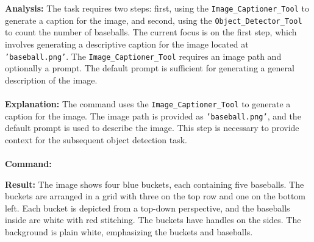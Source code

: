     
    \begin{executorbox}
    
    \textbf{Analysis:}
    The task requires two steps: first, using the \texttt{Image\_Captioner\_Tool} to generate a caption for the image, and second, using the \texttt{Object\_Detector\_Tool} to count the number of baseballs. The current focus is on the first step, which involves generating a descriptive caption for the image located at \texttt{'baseball.png'}. The \texttt{Image\_Captioner\_Tool} requires an image path and optionally a prompt. The default prompt is sufficient for generating a general description of the image.
    \\\\
    \textbf{Explanation:}
    The command uses the \texttt{Image\_Captioner\_Tool} to generate a caption for the image. The image path is provided as \texttt{'baseball.png'}, and the default prompt is used to describe the image. This step is necessary to provide context for the subsequent object detection task.
    \\\\
    \textbf{Command:}
    \end{executorbox}
    
    
    \begin{executorbox}
    \textbf{Result:}
    The image shows four blue buckets, each containing five baseballs. The buckets are arranged in a grid with three on the top row and one on the bottom left. Each bucket is depicted from a top-down perspective, and the baseballs inside are white with red stitching. The buckets have handles on the sides. The background is plain white, emphasizing the buckets and baseballs.
    \end{executorbox}
    
